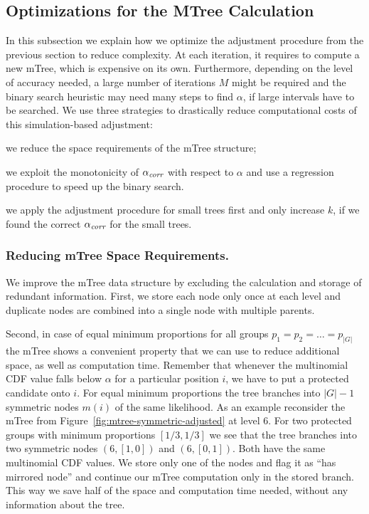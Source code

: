 \subsection{Optimizations for the MTree Calculation}
\label{subsec:mtree-optimization}
In this subsection we explain how we optimize the adjustment procedure from the previous section to reduce complexity.
%
At each iteration, it requires to compute a new mTree, which is expensive on its own.
%
Furthermore, depending on the level of accuracy needed, a large number of iterations $M$ might be required and the binary search heuristic may need many steps to find $\alpha$, if large intervals have to be searched.
%
We use three strategies to drastically reduce computational costs of this simulation-based adjustment:
%
\begin{inparaenum}[(i)]
%
\item we reduce the space requirements of the mTree structure;
%
\item we exploit the monotonicity of $\alpha_\textit{corr}$ with respect to $\alpha$ and use a regression procedure to speed up the binary search.
%
\item we apply the adjustment procedure for small trees first and only increase $k$, if we found the correct  $\alpha_\textit{corr}$ for the small trees.
\end{inparaenum}

\subsubsection{Reducing mTree Space Requirements.}
\label{subsubsec:reducing-space-requirements}
We improve the mTree data structure by excluding the calculation and storage of redundant information.
%
First, we store each node only once at each level and duplicate nodes are combined into a single node with multiple parents.

Second, in case of equal minimum proportions for all groups $p_1 = p_2 = \ldots = p_{|G|}$ the mTree shows a convenient property that we can use to reduce additional space, as well as computation time.
%
Remember that whenever the multinomial CDF value falls below $\alpha$ for a particular position $i$, we have to put a protected candidate onto $i$.
%
For equal minimum proportions the tree branches into $|G| - 1$ symmetric nodes $m(i)$ of the same likelihood.
%
As an example reconsider the mTree from Figure~\ref{fig:mtree-symmetric-adjusted} at level 6.
%
For two protected groups with minimum proportions $[1/3, 1/3]$ we see that the tree branches into two symmetric nodes $(6, [1, 0])$ and $(6, [0,1])$.
%
Both have the same multinomial CDF values.
%
We store only one of the nodes and flag it as ``has mirrored node'' and continue our mTree computation only in the stored branch.
%
This way we save half of the space and computation time needed, without  any information about the tree.

